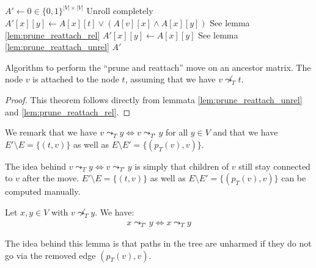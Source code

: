 \begin{algorithm}
    \begin{algorithmic}[1]
            \State $A' \leftarrow 0 \in \{0,1\}^{|V| \times |V|}$
                 \Comment Unroll completely
                        \State $A'[x][y] \leftarrow A[x][t] \vee (A[v][x] \wedge A[x][y])$ \Comment See lemma \ref{lem:prune_reattach_rel}
                    \Else
                        \State $A'[x][y] \leftarrow A[x][y]$ \Comment See lemma \ref{lem:prune_reattach_unrel}
                    \EndIf
                \EndFor
            \EndFor
            \State \Return $A'$
        \EndFunction
    \end{algorithmic}
    \caption{Algorithm to perform the ``prune and reattach'' move on an ancestor matrix. The node $v$ is attached to the node $t$, assuming that we have $v \not\leadsto_T t$.}
    \label{alg:am_prune_reattach}
\end{algorithm}

\begin{proof}
    This theorem follows directly from lemmata \ref{lem:prune_reattach_unrel} and \ref{lem:prune_reattach_rel}.
\end{proof}

\begin{remark}
    \label{rem:prune_reattach}
    We remark that we have $v \leadsto_T y \Leftrightarrow v \leadsto_{T'} y$ for all $y \in V$ and that we have $E' \setminus E = \{(t,v)\}$ as well as $E \setminus E' = \{(p_T(v), v)\}$.
\end{remark}

The idea behind $v \leadsto_T y \Leftrightarrow v \leadsto_{T'} y$ is simply that children of $v$ still stay connected to $v$ after the move. $E' \setminus E = \{(t,v)\}$ as well as $E \setminus E' = \{(p_T(v), v)\}$ can be computed manually.

\begin{lemma}
    \label{lem:prune_reattach_unrel}
    Let $x, y \in V$ with $v \not\leadsto_T y$. We have:
    \begin{align*}
        x \leadsto_{T'} y \Leftrightarrow x \leadsto_T y
    \end{align*}
\end{lemma}

The idea behind this lemma is that paths in the tree are unharmed if they do not go via the removed edge $(p_T(v), v)$.

